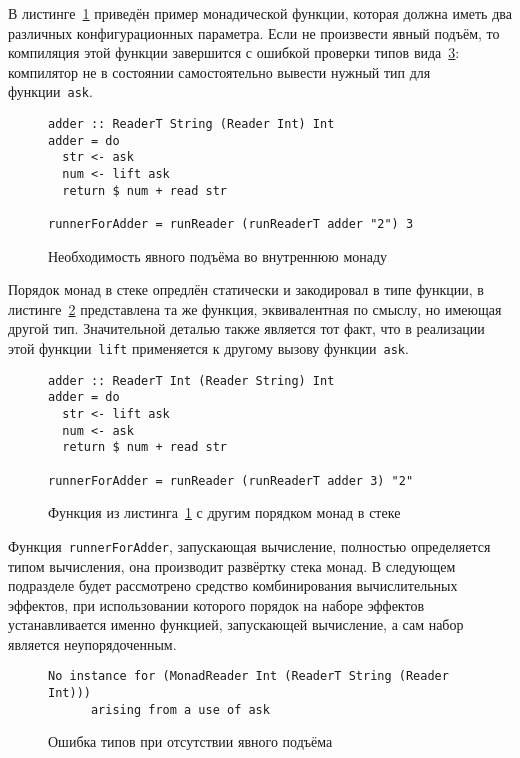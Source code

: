 В листинге~\ref{listing:mtlReadersLift} приведён пример монадической функции, которая должна иметь два различных конфигурационных параметра. Если не произвести явный подъём, то компиляция этой функции завершится с ошибкой проверки типов вида~\ref{listing:mtlCompileError}: компилятор не в состоянии самостоятельно вывести нужный тип для функции~\lstinline{ask}.

\begin{figure}[t]
\begin{lstlisting}
adder :: ReaderT String (Reader Int) Int
adder = do
  str <- ask
  num <- lift ask
  return $ num + read str

runnerForAdder = runReader (runReaderT adder "2") 3
\end{lstlisting}
\caption{Необходимость явного подъёма во внутреннюю монаду}
\label{listing:mtlReadersLift}
\end{figure}

Порядок монад в стеке опредлён статически и закодировал в типе функции, в листинге~\ref{listing:mtlDifferentReadersLift} представлена та же функция, эквивалентная по смыслу, но имеющая другой тип. Значительной деталью также является тот факт, что в реализации этой функции~\lstinline{lift} применяется к другому вызову функции~\lstinline{ask}. 

\begin{figure}[t]
\begin{lstlisting}
adder :: ReaderT Int (Reader String) Int
adder = do
  str <- lift ask
  num <- ask
  return $ num + read str

runnerForAdder = runReader (runReaderT adder 3) "2"
\end{lstlisting}
\caption{Функция из листинга~\ref{listing:mtlReadersLift} с другим порядком монад в стеке}
\label{listing:mtlDifferentReadersLift}
\end{figure}

Функция~\lstinline{runnerForAdder}, запускающая вычисление, полностью определяется типом вычисления, она производит развёртку стека монад. В следующем подразделе будет рассмотрено средство комбинирования вычислительных эффектов, при использовании которого порядок на наборе эффектов устанавливается именно функцией, запускающей вычисление, а сам набор является неупорядоченным.     

\begin{figure}[t]
\begin{lstlisting}
No instance for (MonadReader Int (ReaderT String (Reader Int)))
      arising from a use of ask
\end{lstlisting}
\caption{Ошибка типов при отсутствии явного подъёма}
\label{listing:mtlCompileError}
\end{figure}


